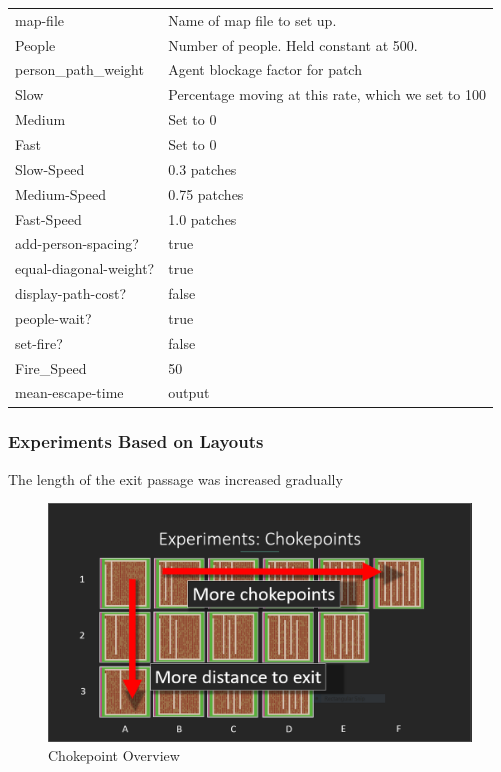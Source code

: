 \documentclass[12pt,letterpaper]{article}
\begin{document}
\begin{tabular}{ l | l }
map-file & Name of map file to set up. \\
People & Number  of people. Held constant at 500. \\
person\_path\_weight & Agent blockage factor for patch \\
Slow & Percentage moving at this rate, which we set to 100 \\
Medium & Set to 0 \\
Fast & Set to 0 \\
Slow-Speed & 0.3 patches \\
Medium-Speed & 0.75 patches \\
Fast-Speed & 1.0 patches \\
add-person-spacing? & true \\
equal-diagonal-weight? & true \\
display-path-cost? & false \\
people-wait? & true \\
set-fire? & false \\
Fire\_Speed & 50 \\
mean-escape-time & output \\
\end{tabular}

\subsubsection{Experiments Based on Layouts}
The length of the exit passage was increased gradually
\begin{figure}
  \includegraphics[width=\linewidth]{./figures/chokepoints_summary.png}
  \caption{Chokepoint Overview}
\end{figure}
\end{document}

